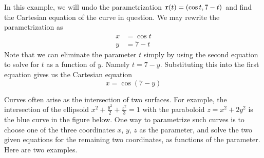 \begin{eg}[Unparametrization of  $\vr(t)=(\cos t, 7-t)$] \label{eg:unparam}
In this example, we will undo the parametrization $\vr(t)=(\cos t, 7-t)$
and find the Cartesian equation of the curve in question. We may rewrite the
parametrization as
\begin{align*}
x&=\cos t \\
y&=7-t
\end{align*}
Note that we can eliminate the parameter $t$ simply by using the second equation 
to solve for $t$ as a function of $y$. Namely $t=7-y$. Substituting this
into the first equation  gives us the Cartesian equation
\begin{equation*}
x=\cos(7-y)
\end{equation*}
\end{eg}

Curves often arise as the intersection of two surfaces. For example,
the intersection of the ellipsoid $x^2+\frac{y^2}{2}+\frac{z^2}{3}=1$
with the paraboloid $z=x^2+2y^2$ is the blue curve in the figure
below.
One way to parametrize such curves is to
choose one of the three coordinates $x$, $y$, $z$ as the parameter,
and solve the two given equations for the remaining two coordinates,
as functions of the parameter. Here are two examples.


